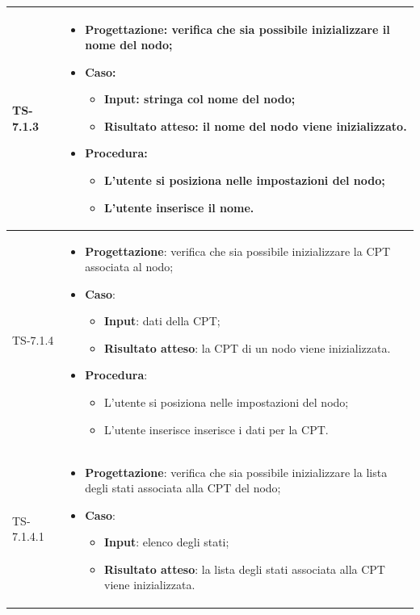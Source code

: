 \begin{longtable}{|C{2.5cm}|C{13cm}|}
	\hline
	{TS-7.1.3} &
\begin{itemize}
	\item \textbf{Progettazione}: verifica che sia possibile inizializzare il nome del nodo;
	\item \textbf{Caso}: 
	\begin{itemize}
		\item \textbf{Input}: stringa col nome del nodo;
		\item \textbf{Risultato atteso}: il nome del nodo viene inizializzato.
	\end{itemize}
	\item \textbf{Procedura}:
	\begin{itemize}
		\item L'utente si posiziona nelle impostazioni del nodo;
		\item L'utente inserisce il nome.
	\end{itemize} 
\end{itemize}
	  \\
	\hline
	{TS-7.1.4} &
\begin{itemize}
	\item \textbf{Progettazione}: verifica che sia possibile inizializzare la CPT associata al nodo;
	\item \textbf{Caso}: 
	\begin{itemize}
		\item \textbf{Input}: dati della CPT;
		\item \textbf{Risultato atteso}: la CPT di un nodo viene inizializzata.
	\end{itemize}
	\item \textbf{Procedura}:
	\begin{itemize}
		\item L'utente si posiziona nelle impostazioni del nodo;
		\item L'utente inserisce inserisce i dati per la CPT.
	\end{itemize} 
\end{itemize}
	  \\
	\hline
	{TS-7.1.4.1} &
\begin{itemize}
	\item \textbf{Progettazione}: verifica che sia possibile inizializzare la lista degli stati associata alla CPT del nodo;
	\item \textbf{Caso}: 
	\begin{itemize}
		\item \textbf{Input}: elenco degli stati;
		\item \textbf{Risultato atteso}: la lista degli stati associata alla CPT viene inizializzata.

\end{itemize}
\end{itemize}
\end{longtable}
